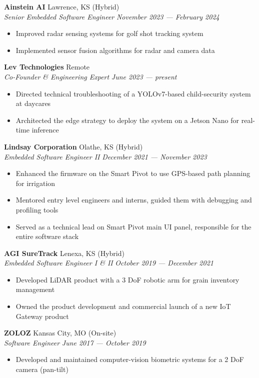 \documentclass[a4paper]{article}
\begin{document}
\textbf{Ainstein AI} \hfill Lawrence, KS (Hybrid)\\
\textit{Senior Embedded Software Engineer} \hfill \textit{November 2023 --- February 2024}\\
\vspace{-1mm}
\begin{itemize}
    \item Improved radar sensing systems for golf shot tracking system
    \item Implemented sensor fusion algorithms for radar and camera data
\end{itemize}
\textbf{Lev Technologies} \hfill Remote\\
\textit{Co-Founder \& Engineering Expert} \hfill \textit{June 2023 --- present}\\
\vspace{-1mm}
\begin{itemize} \itemsep 1pt
    \item Directed technical troubleshooting of a YOLOv7-based child-security system at daycares
    \item Architected the edge strategy to deploy the system on a Jetson Nano for real-time inference
\end{itemize}
\textbf{Lindsay Corporation} \hfill Olathe, KS (Hybrid)\\
\textit{Embedded Software Engineer II} \hfill \textit{December 2021 --- November 2023}\\
\vspace{-1mm}
\begin{itemize} \itemsep 1pt
    \item Enhanced the firmware on the Smart Pivot to use GPS-based path planning for irrigation
    \item Mentored entry level engineers and interns, guided them with debugging and profiling tools
    \item Served as a technical lead on Smart Pivot main UI panel, responsible for the entire software stack
\end{itemize}
\textbf{AGI SureTrack} \hfill Lenexa, KS (Hybrid)\\
\textit{Embedded Software Engineer I \& II} \hfill \textit{October 2019 --- December 2021}\\
\vspace{-1mm}
\begin{itemize} \itemsep 1pt
	\item Developed LiDAR product with a 3 DoF robotic arm for grain inventory management
	\item Owned the product development and commercial launch of a new IoT Gateway product
\end{itemize}
\textbf{ZOLOZ} \hfill Kansas City, MO (On-site)\\
\textit{Software Engineer} \hfill \textit{June 2017 --- October 2019}\\
\vspace{-1mm}
\begin{itemize} \itemsep 1pt
	\item Developed and maintained computer-vision biometric systems for a 2 DoF camera (pan-tilt)
\end{itemize}
\end{document}
